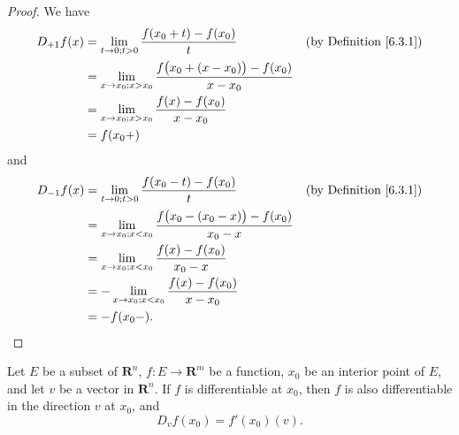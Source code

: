 \begin{proof}
    We have
    \begin{align*}
        D_{+1} f(x) & = \lim_{t \to 0 ; t > 0} \frac{f(x_0 + t) - f(x_0)}{t}                           & \text{(by Definition \ref{6.3.1})} \\
                    & = \lim_{x \to x_0 ; x > x_0} \frac{f\big(x_0 + (x - x_0)\big) - f(x_0)}{x - x_0}                                      \\
                    & = \lim_{x \to x_0 ; x > x_0} \frac{f(x) - f(x_0)}{x - x_0}                                                            \\
                    & = f(x_0+)
    \end{align*}
    and
    \begin{align*}
        D_{-1} f(x) & = \lim_{t \to 0 ; t > 0} \frac{f(x_0 - t) - f(x_0)}{t}                           & \text{(by Definition \ref{6.3.1})} \\
                    & = \lim_{x \to x_0 ; x < x_0} \frac{f\big(x_0 - (x_0 - x)\big) - f(x_0)}{x_0 - x}                                      \\
                    & = \lim_{x \to x_0 ; x < x_0} \frac{f(x) - f(x_0)}{x_0 - x}                                                            \\
                    & = -\lim_{x \to x_0 ; x < x_0} \frac{f(x) - f(x_0)}{x - x_0}                                                           \\
                    & = -f(x_0-).
    \end{align*}
\end{proof}

\setcounter{theorem}{4}
\begin{lemma}\label{6.3.5}
    Let \(E\) be a subset of \(\mathbf{R}^n\), \(f : E \to \mathbf{R}^m\) be a function, \(x_0\) be an interior point of \(E\), and let \(v\) be a vector in \(\mathbf{R}^n\).
    If \(f\) is differentiable at \(x_0\), then \(f\) is also differentiable in the direction \(v\) at \(x_0\), and
    \[
        D_v f(x_0) = f'(x_0)(v).
    \]
\end{lemma}


